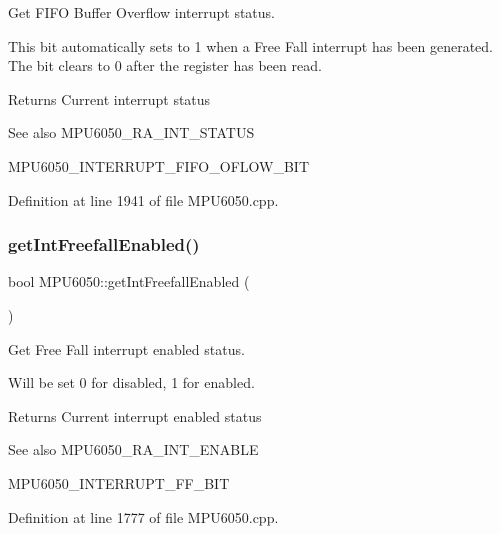 Get F\+I\+FO Buffer Overflow interrupt status. 

This bit automatically sets to 1 when a Free Fall interrupt has been generated. The bit clears to 0 after the register has been read. \begin{DoxyReturn}{Returns}
Current interrupt status 
\end{DoxyReturn}
\begin{DoxySeeAlso}{See also}
M\+P\+U6050\+\_\+\+R\+A\+\_\+\+I\+N\+T\+\_\+\+S\+T\+A\+T\+US 

M\+P\+U6050\+\_\+\+I\+N\+T\+E\+R\+R\+U\+P\+T\+\_\+\+F\+I\+F\+O\+\_\+\+O\+F\+L\+O\+W\+\_\+\+B\+IT 
\end{DoxySeeAlso}


Definition at line 1941 of file M\+P\+U6050.\+cpp.

\mbox{\label{classMPU6050_a500bb2df2e46eaecd3fb2ba7304a5ed3}} 
\subsubsection{\texorpdfstring{getIntFreefallEnabled()}{getIntFreefallEnabled()}}
{\footnotesize\ttfamily bool M\+P\+U6050\+::get\+Int\+Freefall\+Enabled (\begin{DoxyParamCaption}{ }\end{DoxyParamCaption})}



Get Free Fall interrupt enabled status. 

Will be set 0 for disabled, 1 for enabled. \begin{DoxyReturn}{Returns}
Current interrupt enabled status 
\end{DoxyReturn}
\begin{DoxySeeAlso}{See also}
M\+P\+U6050\+\_\+\+R\+A\+\_\+\+I\+N\+T\+\_\+\+E\+N\+A\+B\+LE 

M\+P\+U6050\+\_\+\+I\+N\+T\+E\+R\+R\+U\+P\+T\+\_\+\+F\+F\+\_\+\+B\+IT 
\end{DoxySeeAlso}


Definition at line 1777 of file M\+P\+U6050.\+cpp.

\mbox{\label{classMPU6050_a06bbc2116235b7cc5e28c877e0576749}} 
